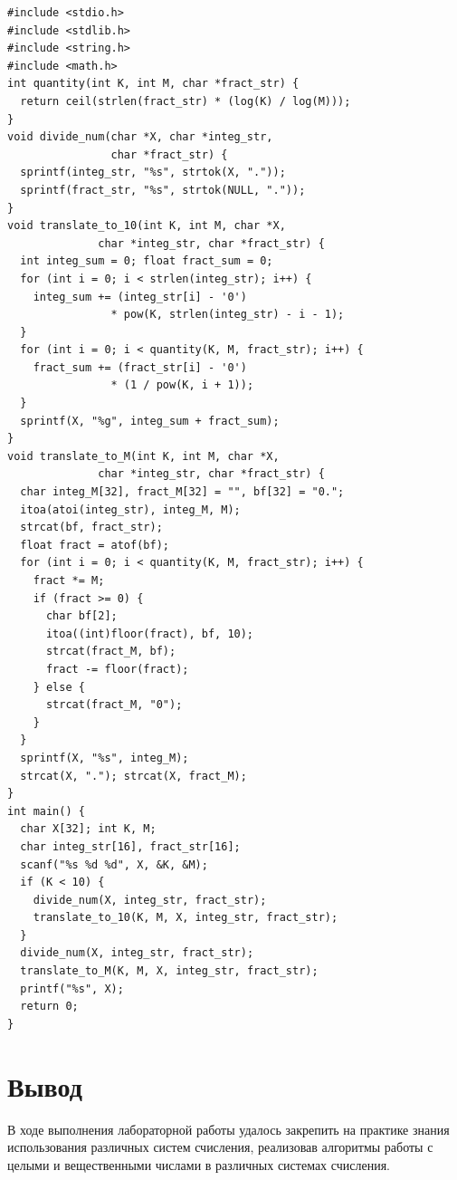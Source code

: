 \documentclass[a4paper,14pt]{extarticle}
\begin{document}
  \begin{lstlisting}[tabsize=2,basicstyle=\ttfamily]
#include <stdio.h>
#include <stdlib.h>
#include <string.h>
#include <math.h>
int quantity(int K, int M, char *fract_str) {
  return ceil(strlen(fract_str) * (log(K) / log(M)));
}
void divide_num(char *X, char *integ_str, 
                char *fract_str) {
  sprintf(integ_str, "%s", strtok(X, "."));
  sprintf(fract_str, "%s", strtok(NULL, "."));
}
void translate_to_10(int K, int M, char *X, 
              char *integ_str, char *fract_str) {
  int integ_sum = 0; float fract_sum = 0;
  for (int i = 0; i < strlen(integ_str); i++) {
    integ_sum += (integ_str[i] - '0') 
                * pow(K, strlen(integ_str) - i - 1);
  }
  for (int i = 0; i < quantity(K, M, fract_str); i++) {
    fract_sum += (fract_str[i] - '0') 
                * (1 / pow(K, i + 1));
  }
  sprintf(X, "%g", integ_sum + fract_sum);
}
void translate_to_M(int K, int M, char *X, 
              char *integ_str, char *fract_str) {
  char integ_M[32], fract_M[32] = "", bf[32] = "0.";
  itoa(atoi(integ_str), integ_M, M);
  strcat(bf, fract_str);
  float fract = atof(bf);
  for (int i = 0; i < quantity(K, M, fract_str); i++) {
    fract *= M;
    if (fract >= 0) {
      char bf[2];
      itoa((int)floor(fract), bf, 10);
      strcat(fract_M, bf);
      fract -= floor(fract);
    } else {
      strcat(fract_M, "0");
    }
  }
  sprintf(X, "%s", integ_M);
  strcat(X, "."); strcat(X, fract_M);
}
int main() {
  char X[32]; int K, M; 
  char integ_str[16], fract_str[16];
  scanf("%s %d %d", X, &K, &M);
  if (K < 10) {
    divide_num(X, integ_str, fract_str);
    translate_to_10(K, M, X, integ_str, fract_str);
  }
  divide_num(X, integ_str, fract_str);
  translate_to_M(K, M, X, integ_str, fract_str);
  printf("%s", X);
  return 0;
}
  \end{lstlisting}

  \section*{Вывод}
  В ходе выполнения лабораторной работы удалось закрепить на практике знания использования различных систем счисления, реализовав алгоритмы работы с целыми и вещественными числами в различных системах счисления.
\end{document}
